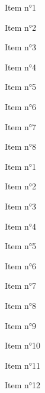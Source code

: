 \documentclass{article}
\begin{document}
\begin{enumerateCircle}
	\item Item n°1
	\item Item n°2
	\item Item n°3
	\item Item n°4
	\item Item n°5
	\item Item n°6
	\item Item n°7
	\item Item n°8
\end{enumerateCircle}

\begin{enumerateCircle}
	\item Item n°1
	\item Item n°2
	\item Item n°3
	\item Item n°4
	\item Item n°5
	\item Item n°6
	\item Item n°7
	\item Item n°8
	\item Item n°9
	\item Item n°10
	\item Item n°11
	\item Item n°12
\end{enumerateCircle}
\end{document}
